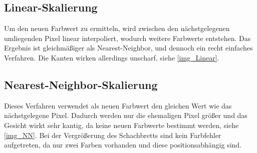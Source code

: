 \subsection{Linear-Skalierung}
Um den neuen Farbwert zu ermitteln, wird zwischen den nächstgelegenen umliegenden Pixel linear interpoliert, wodurch weitere Farbwerte entstehen. Das Ergebnis ist gleichmäßiger als Nearest-Neighbor, und dennoch ein recht einfaches Verfahren. Die Kanten wirken allerdings unscharf, siehe \autoref{img_Linear}.
\subsection{Nearest-Neighbor-Skalierung}
Dieses Verfahren verwendet als neuen Farbwert den gleichen Wert wie das nächstgelegene Pixel. Dadurch werden nur die ehemaligen Pixel größer und das Gesicht wirkt sehr kantig, da keine neuen Farbwerte bestimmt werden, siehe \autoref{img_NN}. Bei der Vergrößerung des Schachbretts sind kein Farbfehler aufgetreten, da nur zwei Farben vorhanden und diese positionsabhängig sind.
